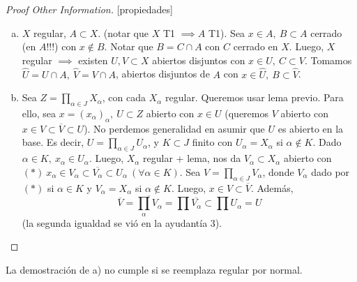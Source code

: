 \begin{proof}[Proof Other Information][propiedades]
	\begin{enumerate}[a)]
		\item $X$ regular, $A \subset X$. (notar que $X$ T1 $\implies A$ T1). Sea $x \in A,\ B \subset A$ cerrado (en $A$!!!) con $x \not\in B$. Notar que $B = C \cap A$ con $C$ cerrado en $X$. Luego, $X$ regular $\implies$ existen $U,V \subset X$ abiertos disjuntos con $x \in U,\ C \subset V$. Tomamos $\widehat{U} = U \cap A,\ \widehat{V} = V \cap A$, abiertos disjuntos de $A$ con $x \in \widehat{U},\ B \subset \widehat{V}$.

		\item Sea $Z = \prod_{\alpha \in J} X_{\alpha}$, con cada $X_{\alpha}$ regular. Queremos usar lema previo. Para ello, sea $x = (x_{\alpha})_{\alpha},\ U \subset Z$ abierto con $x \in U$ (queremos $V$ abierto con $x \in V \subset \overline{V} \subset U$). No perdemos generalidad en asumir que $U$ es abierto en la base. Es decir, $U = \prod_{\alpha \in J} U_{\alpha}$, y $K \subset J$ finito con $U_{\alpha} = X_{\alpha}$ si $\alpha \not\in K$. Dado $\alpha \in K,\ x_{\alpha} \in U_{\alpha}$. Luego, $X_{\alpha}$ regular + lema, nos da $V_{\alpha} \subset X_{\alpha}$ abierto con $(*)\ x_{\alpha} \in V_{\alpha} \subset \overline{V_{\alpha}} \subset U_{\alpha} \ (\forall \alpha \in K)$. Sea $V = \prod_{\alpha \in J} V_{\alpha}$, donde $V_{\alpha}$ dado por $(*)$ si $\alpha \in K$ y $V_{\alpha} = X_{\alpha}$ si $\alpha \not\in K$. Luego, $x \in V \subset  \overline{V}$. Además,
		\[ \overline{V} = \overline{\prod_{\alpha} V_{\alpha}} = \prod \overline{V_{\alpha}} \subset \prod U_{\alpha} = U \]
		(la segunda igualdad se vió en la ayudantía 3).
	\end{enumerate}
\end{proof}

\begin{remark}
	La demostración de a) no cumple si se reemplaza regular por normal.
\end{remark}
